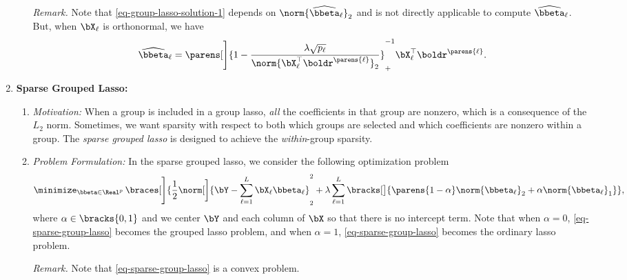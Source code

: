 \documentclass[12pt]{article}
\begin{document}
\begin{enumerate}[label=\textbf{\arabic*.}]
\begin{enumerate}
		\textit{Remark.} Note that \eqref{eq-group-lasso-solution-1} depends on $\norm{\widehat{\bbeta}_{\ell}}_2$ and is not directly applicable to compute $\widehat{\bbeta}_{\ell}$. But, when $\bX_{\ell}$ is orthonormal, we have 
		\begin{align*}
			\widehat{\bbeta}_{\ell} = \parens[\Bigg]{1 - \frac{\lambda \sqrt{p_{\ell}}}{\norm{\bX_{\ell}^\top \boldr^{\parens{\ell}}}_2}}_+^{-1} \bX_{\ell}^\top \boldr^{\parens{\ell}}. 
		\end{align*}
	\end{enumerate}
	
	\item \textbf{Sparse Grouped Lasso:}
	\begin{enumerate}
	
		\item \textit{Motivation:} When a group is included in a group lasso, \emph{all} the coefficients in that group are nonzero, which is a consequence of the $L_2$ norm. Sometimes, we want sparsity with respect to both which groups are selected and which coefficients are nonzero within a group. The \textit{sparse grouped lasso} is designed to achieve the \emph{within}-group sparsity. 

		\item \textit{Problem Formulation:} In the sparse grouped lasso, we consider the following optimization problem 
		\begin{align}\label{eq-sparse-group-lasso}
			\minimize_{\bbeta \in \Real^{p}} \, \braces[\Bigg]{\frac{1}{2} \norm[\bigg]{\bY - \sum_{\ell=1}^L \bX_{\ell} \bbeta_{\ell}}_2^2 + \lambda \sum_{\ell=1}^L \bracks[\big]{\parens{1 - \alpha} \norm{\bbeta_{\ell}}_2 + \alpha \norm{\bbeta_{\ell}}_1}}, 
		\end{align}
		where $\alpha \in \bracks{0, 1}$ and we center $\bY$ and each column of $\bX$ so that there is no intercept term. Note that when $\alpha = 0$,  \eqref{eq-sparse-group-lasso} becomes the grouped lasso problem, and when $\alpha = 1$, \eqref{eq-sparse-group-lasso} becomes the ordinary lasso problem. 
		
		\textit{Remark.} Note that \eqref{eq-sparse-group-lasso} is a convex problem. 
		

\end{enumerate}
\end{enumerate}
\end{document}
